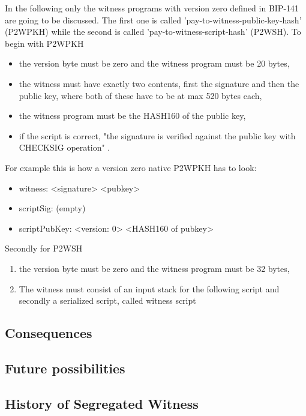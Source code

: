 In the following only the witness programs with version zero defined in BIP-141 are going to be discussed. The first one is called 'pay-to-witness-public-key-hash' (P2WPKH) while the second is called 'pay-to-witness-script-hash' (P2WSH). To begin with P2WPKH
\begin{itemize}
    \item the version byte must be zero and the witness program must be 20 bytes,
    \item the witness must have exactly two contents, first the signature and then the public key, where both of these have to be at max 520 bytes each,
    \item the witness program must be the HASH160 of the public key,
    \item if the script is correct, "the signature is verified against the public key with CHECKSIG operation" \cite{bip-141}.
\end{itemize}

For example this is how a version zero native P2WPKH has to look:
\begin{itemize}
    \item witness: <signature> <pubkey>
    \item scriptSig: (empty)
    \item scriptPubKey: <version: 0> <HASH160 of pubkey>
\end{itemize}

Secondly for P2WSH
\begin{enumerate}
    \item the version byte must be zero and the witness program must be 32 bytes,
    \item The witness must consist of an input stack for the following script and secondly a serialized script, called witness script
\end{enumerate}



\subsection{Consequences}
\label{sec:SegWit:Consequences}


\subsection{Future possibilities}
\label{sec:SegWit:Future}

\subsection{History of Segregated Witness}
\label{sec:SegWit:History}


